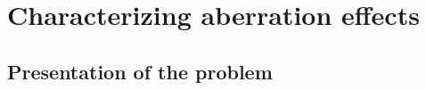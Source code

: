 \documentclass[12pt]{iopart}
\begin{document}







\section{Characterizing aberration effects}

\subsection{Presentation of the problem}
\end{document}
